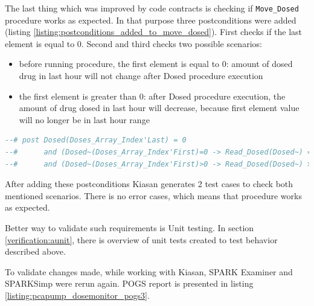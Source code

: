 The last thing which was improved by code contracts is checking if \lstinline{Move_Dosed} procedure works as expected. In that purpose three postconditions were added (listing \ref{listing:postconditions_added_to_move_dosed}). First checks if the last element is equal to 0. Second and third checks two possible scenarios: 
\begin{itemize}
    \item before running procedure, the first element is equal to 0: amount of dosed drug in last hour will not change after Dosed procedure execution
    \item the first element is greater than 0: after Dosed procedure execution, the amount of drug dosed in last hour will decrease, because first element value will no longer be in last hour range
\end{itemize}

\singlespacing
\begin{lstlisting}[language=ada, frame=single, gobble=0, caption={Postconditions added to Move\_Dosed procedure}, label={listing:postconditions_added_to_move_dosed}]
--# post Dosed(Doses_Array_Index'Last) = 0 
--#      and (Dosed~(Doses_Array_Index'First)=0 -> Read_Dosed(Dosed~) = Read_Dosed(Dosed))
--#      and (Dosed~(Doses_Array_Index'First)>0 -> Read_Dosed(Dosed~) > Read_Dosed(Dosed));
\end{lstlisting}
\doublespacing

After adding these postconditions Kiasan generates 2 test cases to check both mentioned scenarios. There is no error cases, which means that procedure works as expected. 

Better way to validate such requirements is Unit testing. In section \ref{verification:aunit}, there is overview of unit tests created to test behavior described above.

To validate changes made, while working with Kiasan, SPARK Examiner and SPARKSimp were rerun again. POGS report is presented in listing \ref{listing:pcapump_dosemonitor_pogs3}.


